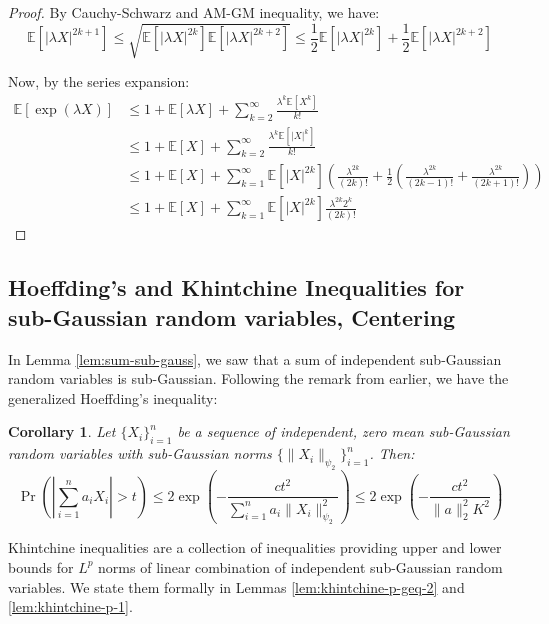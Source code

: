 \documentclass{article}
\newtheorem{corollary}{Corollary}[subsection]
\theoremstyle{remark}
\newcommand{\Exp}{\mathbb{E}}
\begin{document}
\begin{proof}
By Cauchy-Schwarz and AM-GM inequality, we have:
\begin{equation*}
\Exp[|\lambda X|^{2k + 1}] \leq \sqrt{\Exp[|\lambda X|^{2k}] \Exp[|\lambda X|^{2k + 2}]} \leq \frac{1}{2}\Exp[|\lambda X|^{2k}] + \frac{1}{2}\Exp[|\lambda X|^{2k + 2}]
\end{equation*}

Now, by the series expansion:
\begin{align*}
\Exp[\exp(\lambda X)] &\leq 1 + \Exp[\lambda X] + \sum_{k=2}^{\infty} \frac{\lambda^{k} \Exp[X^{k}]}{k!} \\
&\leq 1 + \Exp[X] + \sum_{k=2}^{\infty} \frac{\lambda^{k} \Exp[|X|^{k}]}{k!} \\
&\leq 1 + \Exp[X] + \sum_{k=1}^{\infty} \Exp[|X|^{2k}]\left(\frac{\lambda^{2k}}{(2k)!} + \frac{1}{2}\left(\frac{\lambda^{2k}}{(2k - 1)!} + \frac{\lambda^{2k}}{(2k + 1)!}\right)\right) \\
&\leq 1 + \Exp[X] + \sum_{k=1}^{\infty} \Exp[|X|^{2k}]\frac{\lambda^{2k}2^{k}}{(2k)!}
\end{align*}
\end{proof}

\subsection{Hoeffding's and Khintchine Inequalities for sub-Gaussian random variables, Centering}
In Lemma \ref{lem:sum-sub-gauss}, we saw that a sum of independent sub-Gaussian random variables is sub-Gaussian. Following the remark from earlier, we have the generalized Hoeffding's inequality:
\begin{corollary}
\label{cor:hoeffding-sub-gaussian}
Let \(\{X_{i}\}_{i=1}^{n}\) be a sequence of independent, zero mean sub-Gaussian random variables with sub-Gaussian norms \(\{\|X_{i}\|_{\psi_{2}}\}_{i=1}^{n}\). Then:
\begin{equation*}
\Pr\left(\left|\sum_{i=1}^{n} a_{i}X_{i}\right| > t\right) \leq 2\exp\left(-\frac{ct^{2}}{\sum\limits_{i=1}^{n}a_{i}\|X_{i}\|_{\psi_{2}}^{2}}\right) \leq 2\exp\left(-\frac{ct^{2}}{\|a\|_{2}^{2}K^{2}}\right)
\end{equation*}
\end{corollary}

Khintchine inequalities are a collection of inequalities providing upper and lower bounds for \(L^{p}\) norms of linear combination of independent sub-Gaussian random variables. We state them formally in Lemmas \ref{lem:khintchine-p-geq-2} and \ref{lem:khintchine-p-1}.
\end{document}
